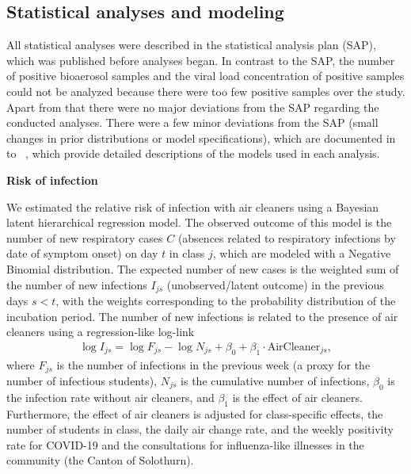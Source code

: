 \documentclass[fleqn,11pt]{wlscirep}
\begin{document}
\subsection{Statistical analyses and modeling}

All statistical analyses were described in the statistical analysis plan (SAP)\cite{Banholzer2023SAP}, which was published before analyses began. In contrast to the SAP, the number of positive bioaerosol samples and the viral load concentration of positive samples could not be analyzed because there were too few positive samples over the study. Apart from that there were no major deviations from the SAP regarding the conducted analyses. There were a few minor deviations from the SAP (\eg small changes in prior distributions or model specifications), which are documented in \supp~ to \supp~, which provide detailed descriptions of the models used in each analysis.

\noindent\textbf{Risk of infection} \smallskip

\noindent We estimated the relative risk of infection with air cleaners using a Bayesian latent hierarchical regression model. The observed outcome of this model is the number of new respiratory cases $C$ (absences related to respiratory infections by date of symptom onset) on day $t$ in class $j$, which are modeled with a Negative Binomial distribution. The expected number of new cases is the weighted sum of the number of new infections $I_{js}$ (unobserved/latent outcome) in the previous days $s<t$, with the weights corresponding to the probability distribution of the incubation period. The number of new infections is related to the presence of air cleaners using a regression-like log-link
\begin{align}
    \log I_{js} = \log F_{js} - \log N_{js} + \beta_0 + \beta_1 \cdot \text{AirCleaner}_{js},
\end{align}
where $F_{js}$ is the number of infections in the previous week (a proxy for the number of infectious students), $N_{js}$ is the cumulative number of infections, $\beta_0$ is the infection rate without air cleaners, and $\beta_1$ is the effect of air cleaners. Furthermore, the effect of air cleaners is adjusted for class-specific effects, the number of students in class, the daily air change rate, and the weekly positivity rate for COVID-19 and the consultations for influenza-like illnesses in the community (\ie the Canton of Solothurn).
\end{document}
